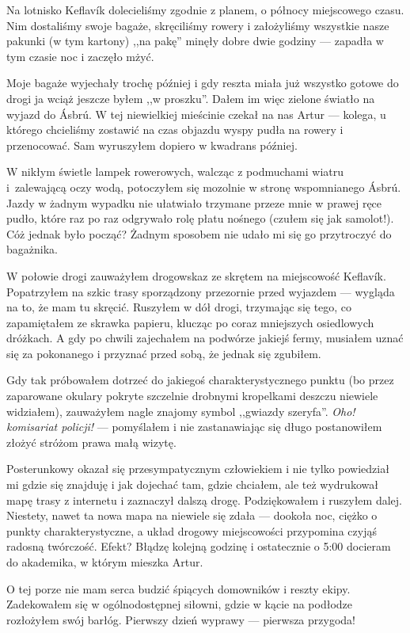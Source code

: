 Na lotnisko Keflavík dolecieliśmy zgodnie z planem, o północy miejscowego czasu. Nim dostaliśmy swoje bagaże, skręciliśmy rowery i założyliśmy wszystkie nasze pakunki (w tym kartony) ,,na pakę'' minęły dobre dwie godziny --- zapadła w tym czasie noc i zaczęło mżyć.

Moje bagaże wyjechały trochę później i gdy reszta miała już wszystko gotowe do drogi ja wciąż jeszcze byłem ,,w proszku''. Dałem im więc zielone światło na wyjazd do Ásbrú. W tej niewielkiej mieścinie czekał na nas Artur --- kolega, u którego chcieliśmy zostawić na czas objazdu wyspy pudła na rowery i przenocować. Sam wyruszyłem dopiero w kwadrans później.

W nikłym świetle lampek rowerowych, walcząc z podmuchami wiatru i~zalewającą oczy wodą, potoczyłem się mozolnie w stronę wspomnianego Ásbrú. Jazdy w żadnym wypadku nie ułatwiało trzymane przeze mnie w prawej ręce pudło, które raz po raz odgrywało rolę płatu nośnego (czułem się jak samolot!). Cóż jednak było począć? Żadnym sposobem nie udało mi się go przytroczyć do bagażnika.

W połowie drogi zauważyłem drogowskaz ze skrętem na miejscowość Keflavík. Popatrzyłem na szkic trasy sporządzony przezornie przed wyjazdem --- wygląda na to, że mam tu skręcić. Ruszyłem w dół drogi, trzymając się tego, co zapamiętałem ze skrawka papieru, klucząc po coraz mniejszych osiedlowych dróżkach. A gdy po chwili zajechałem na podwórze jakiejś fermy, musiałem uznać się za pokonanego i przyznać przed sobą, że jednak się zgubiłem.

Gdy tak próbowałem dotrzeć do jakiegoś charakterystycznego punktu (bo przez zaparowane okulary pokryte szczelnie drobnymi kropelkami deszczu niewiele widziałem), zauważyłem nagle znajomy symbol ,,gwiazdy szeryfa''. \emph{Oho! komisariat policji!} --- pomyślałem i nie zastanawiając się długo postanowiłem złożyć stróżom prawa małą wizytę.

Posterunkowy okazał się przesympatycznym człowiekiem i nie tylko powiedział mi gdzie się znajduję i jak dojechać tam, gdzie chciałem, ale też wydrukował mapę trasy z internetu i zaznaczył dalszą drogę. Podziękowałem i ruszyłem dalej. Niestety, nawet ta nowa mapa na niewiele się zdała --- dookoła noc, ciężko o punkty charakterystyczne, a układ drogowy miejscowości przypomina czyjąś radosną twórczość. Efekt? Błądzę kolejną godzinę i ostatecznie o 5:00 docieram do akademika, w którym mieszka Artur.

O tej porze nie mam serca budzić śpiących domowników i reszty ekipy. Zadekowałem się w ogólnodostępnej siłowni, gdzie w kącie na podłodze rozłożyłem swój barłóg. Pierwszy dzień wyprawy --- pierwsza przygoda!